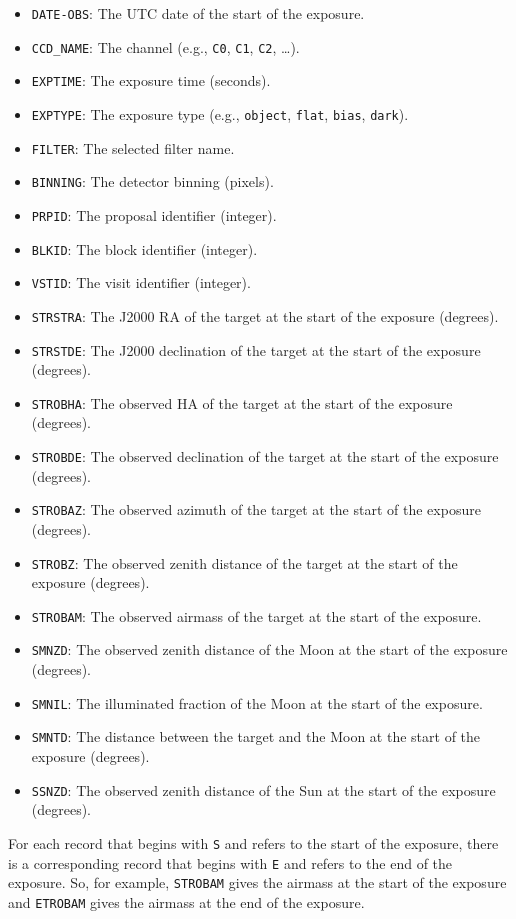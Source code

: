 \begin{itemize}
\item \verb|DATE-OBS|: The UTC date of the start of the exposure.
\item \verb|CCD_NAME|: The channel (e.g., \verb|C0|, \verb|C1|, \verb|C2|, \ldots).
\item \verb|EXPTIME|: The exposure time (seconds).
\item \verb|EXPTYPE|: The exposure type (e.g., \verb|object|, \verb|flat|, \verb|bias|, \verb|dark|).
\item \verb|FILTER|: The selected filter name.
\item \verb|BINNING|: The detector binning (pixels).
\item \verb|PRPID|: The proposal identifier (integer).
\item \verb|BLKID|: The block identifier (integer).
\item \verb|VSTID|: The visit identifier (integer).
\item \verb|STRSTRA|: The J2000 RA of the target at the start of the exposure (degrees).
\item \verb|STRSTDE|: The J2000 declination of the target at the start of the exposure (degrees).
\item \verb|STROBHA|: The observed HA of the target at the start of the exposure (degrees).
\item \verb|STROBDE|: The observed declination of the target at the start of the exposure (degrees).
\item \verb|STROBAZ|: The observed azimuth of the target at the start of the exposure (degrees).
\item \verb|STROBZ|: The observed zenith distance of the target at the start of the exposure (degrees).
\item \verb|STROBAM|: The observed airmass of the target at the start of the exposure.
\item \verb|SMNZD|: The observed zenith distance of the Moon at the start of the exposure (degrees).
\item \verb|SMNIL|: The illuminated fraction of the Moon at the start of the exposure.
\item \verb|SMNTD|: The distance between the target and the Moon at the start of the exposure (degrees).
\item \verb|SSNZD|: The observed zenith distance of the Sun at the start of the exposure (degrees).
\end{itemize}

For each record that begins with \verb|S| and refers to the start of the exposure, there is a corresponding record that begins with \verb|E| and refers to the end of the exposure. So, for example, \verb|STROBAM| gives the airmass at the start of the exposure and \verb|ETROBAM| gives the airmass at the end of the exposure.

